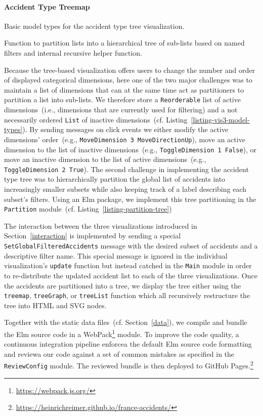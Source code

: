 \paragraph{Accident Type Treemap}
\begin{listing}
    
    \caption{Basic model types for the accident type tree visualization.}
    \label{listing-vis3-model-types}
\end{listing}
\begin{listing}
    
    \caption{Function to partition lists into a hierarchical tree of sub-lists based on named filters and internal recursive helper function.}
    \label{listing-partition-tree}
\end{listing}
Because the tree-based visualization offers users to change the number and order of displayed categorical dimensions, here one of the two major challenges was to maintain a list of dimensions that can at the same time act as partitioners to partition a list into sub-lists.
We therefore store a \lstinline{Reorderable} list of active dimensions~(i.e., dimensions that are currently used for filtering) and a not necessarily ordered \lstinline{List} of inactive dimensions~(cf. Listing~\ref{listing-vis3-model-types}).
By sending messages on click events we either modify the active dimensions' order~(e.g., \lstinline{MoveDimension 3 MoveDirectionUp}), move an active dimension to the list of inactive dimensions~(e.g., \lstinline{ToggleDimension 1 False}), or move an inactive dimension to the list of active dimensions~(e.g., \lstinline{ToggleDimension 2 True}).
The second challenge in implementing the accident type tree was to hierarchically partition the global list of accidents into increasingly smaller subsets while also keeping track of a label describing each subset's filters.
Using an Elm package, we implement this tree partitioning in the \lstinline{Partition} module~(cf. Listing~\ref{listing-partition-tree})

The interaction between the three visualizations introduced in Section~\ref{interaction} is implemented by sending a special \lstinline{SetGlobalFilteredAccidents} message with the desired subset of accidents and a descriptive filter name. This special message is ignored in the individual visualization's \lstinline{update} function but instead catched in the \lstinline{Main} module in order to re-distribute the updated accident list to each of the three visualizations.
Once the accidents are partitioned into a tree, we display the tree either using the \lstinline{treemap}, \lstinline{treeGraph}, or \lstinline{treeList} function which all recursively restructure the tree into HTML and SVG nodes.

Together with the static data files~(cf. Section~\ref{data}), we compile and bundle the Elm source code in a WebPack\footnote{\url{https://webpack.js.org/}} module. To improve the code quality, a continuous integration pipeline enforcea the default Elm source code formatting and reviewa our code against a set of common mistakes as specified in the \lstinline{ReviewConfig} module.
The reviewed bundle is then deployed to GitHub Pages.\footnote{\url{https://heinrichreimer.github.io/france-accidents/}}
